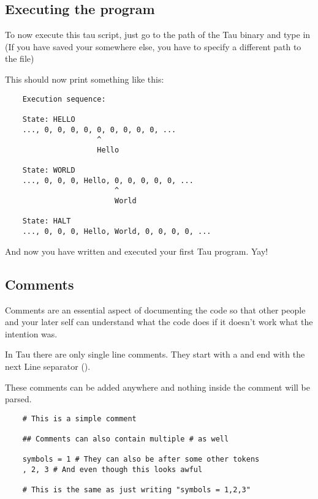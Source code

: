 \subsection{Executing the program}
To now execute this tau script, just go to the path of the Tau binary and type in  
(If you have saved your  somewhere else, you have to specify a different path to the file)

This should now print something like this:
\begin{verbatim}
    Execution sequence:

    State: HELLO
    ..., 0, 0, 0, 0, 0, 0, 0, 0, 0, ...
                     ^
                     Hello

    State: WORLD
    ..., 0, 0, 0, Hello, 0, 0, 0, 0, 0, ...
                         ^
                         World

    State: HALT
    ..., 0, 0, 0, Hello, World, 0, 0, 0, 0, ...
\end{verbatim}

And now you have written and executed your first Tau program. Yay!

\subsection{Comments}
Comments are an essential aspect of documenting the code so that other people and your later self can understand what the code does
if it doesn't work what the intention was.

In Tau there are only single line comments. They start with a \code{\#} and end with the next Line separator ().

These comments can be added anywhere and nothing inside the comment will be parsed.

\begin{verbatim}
    # This is a simple comment

    ## Comments can also contain multiple # as well

    symbols = 1 # They can also be after some other tokens
    , 2, 3 # And even though this looks awful

    # This is the same as just writing "symbols = 1,2,3"
\end{verbatim}
